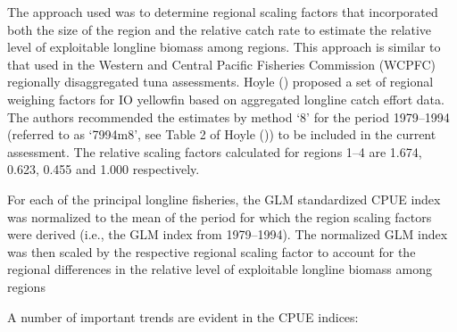 \documentclass[
]{scrartcl}
\begin{document}
The approach used was to determine regional scaling factors that
incorporated both the size of the region and the relative catch rate to
estimate the relative level of exploitable longline biomass among
regions. This approach is similar to that used in the Western and
Central Pacific Fisheries Commission (WCPFC) regionally disaggregated
tuna assessments. Hoyle
() proposed a set of
regional weighing factors for IO yellowfin based on aggregated longline
catch effort data. The authors recommended the estimates by method `8'
for the period 1979--1994 (referred to as `7994m8', see Table 2 of Hoyle
()) to be included in
the current assessment. The relative scaling factors calculated for
regions 1--4 are 1.674, 0.623, 0.455 and 1.000 respectively.

For each of the principal longline fisheries, the GLM standardized CPUE
index was normalized to the mean of the period for which the region
scaling factors were derived (i.e., the GLM index from 1979--1994). The
normalized GLM index was then scaled by the respective regional scaling
factor to account for the regional differences in the relative level of
exploitable longline biomass among regions

A number of important trends are evident in the CPUE indices:
\end{document}
